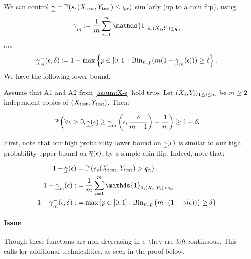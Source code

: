     We can control $\underline{\gamma}=\mathbb{P}(\Bar{s}_{\epsilon}(X_\mathrm{test}, Y_\mathrm{test})\leq q_\alpha)$ similarly (up to a coin flip), using
    $$
        \covminm := \frac{1}{m}\sum\limits_{i=1}^{m}\mathds{1}_{\sse(\XYi) \leq q_\alpha}
    $$
    and
    $$
        \underline{\gamma}_{m}^{-}(\epsilon,\delta) := 1-\max\left\{p\in[0,1] : \mathrm{Bin}_{m,p}(m(1-\underline{\gamma}_{m}(\epsilon)))\geq\delta\right\}.
    $$
    We have the following lower bound.



    \begin{theorem}
    \label{thm:appendix-thm-2}
        Assume that A1 and A2 from \ref{assum:X-s} hold true. Let $(X_i, Y_i)_{1\leq i \leq m}$ be $m\geq2$ independent copies of $(X_\mathrm{test}, Y_\mathrm{test})$. Then:

        \begin{equation}
            \mathbb{P}\left(\forall \epsilon > 0, \underline{\gamma}(\epsilon) \geq \underline{\gamma}_{m}^{-}\left(\epsilon, \frac{\delta}{m-1}\right)-\frac{1}{m}\right) \geq 1-\delta.
        \end{equation}
    \end{theorem}


    First, note that our high probability lower bound on $\underline{\gamma}(\epsilon)$ is similar to our high probability upper bound on $\overline{\gamma}(\epsilon)$, by a simple coin flip. Indeed, note that:

    \begin{equation}
    \begin{aligned}
        1 - \covmin(\epsilon) &= \mathbb{P}\left(\sse(\XYt) > q_\alpha\right). \\
        1 - \covminm(\epsilon) :&= \frac{1}{m}\sum\limits_{i=1}^m \mathds{1}_{\sse(\XYi) > q_\alpha} \\
        1 - \covminmm(\epsilon, \delta) :&= \max\{ p \in [0,1]: \mathrm{Bin}_{m,p}\left( m \cdot (1 - \covmin(\epsilon))\right) \geq \delta \}
    \end{aligned}
    \end{equation}

    \paragraph{Issue} Though these functions are non-decreasing in $\epsilon$, they are \textit{left}-continuous. This calls for additional technicalities, as seen in the proof below.

